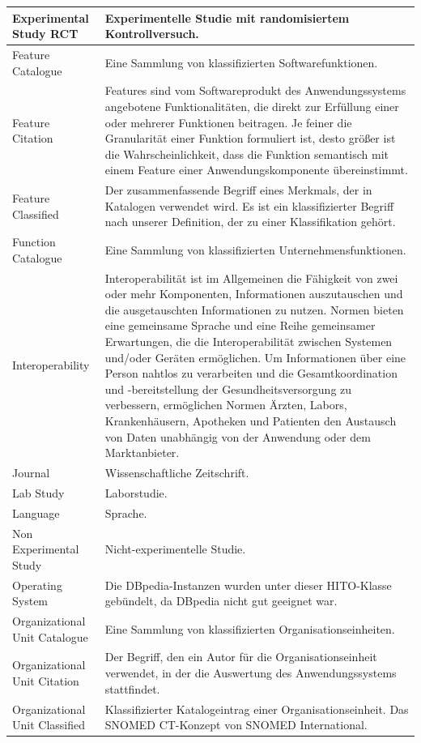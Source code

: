 \begin{longtable}{ | p{} | p{7 cm} | }
\hline
Experimental Study RCT &  Experimentelle Studie mit randomisiertem Kontrollversuch. \\
\hline
Feature Catalogue & Eine Sammlung von klassifizierten Softwarefunktionen. \\
\hline
Feature Citation & Features sind vom Softwareprodukt des Anwendungssystems angebotene Funktionalitäten, die direkt zur Erfüllung einer oder mehrerer Funktionen beitragen. Je feiner die Granularität einer Funktion formuliert ist, desto größer ist die Wahrscheinlichkeit, dass die Funktion semantisch mit einem Feature einer Anwendungskomponente übereinstimmt. \\
\hline
Feature Classified & Der zusammenfassende Begriff eines Merkmals, der in Katalogen verwendet wird. Es ist ein klassifizierter Begriff nach unserer Definition, der zu einer Klassifikation gehört.  \\
\hline
Function Catalogue & Eine Sammlung von klassifizierten Unternehmensfunktionen. \\
\hline
Interoperability & Interoperabilität ist im Allgemeinen die Fähigkeit von zwei oder mehr Komponenten, Informationen auszutauschen und die ausgetauschten Informationen zu nutzen. Normen bieten eine gemeinsame Sprache und eine Reihe gemeinsamer Erwartungen, die die Interoperabilität zwischen Systemen und/oder Geräten ermöglichen. Um Informationen über eine Person nahtlos zu verarbeiten und die Gesamtkoordination und -bereitstellung der Gesundheitsversorgung zu verbessern, ermöglichen Normen Ärzten, Labors, Krankenhäusern, Apotheken und Patienten den Austausch von Daten unabhängig von der Anwendung oder dem Marktanbieter. \\
\hline
Journal & Wissenschaftliche Zeitschrift. \\
\hline
Lab Study & Laborstudie. \\
\hline
Language & Sprache. \\
\hline
Non Experimental Study & Nicht-experimentelle Studie. \\
\hline
Operating System & Die DBpedia-Instanzen wurden unter dieser HITO-Klasse gebündelt, da DBpedia nicht gut geeignet war. \\
\hline
Organizational Unit Catalogue & Eine Sammlung von klassifizierten Organisationseinheiten. \\
\hline
Organizational Unit Citation & Der Begriff, den ein Autor für die Organisationseinheit verwendet, in der die Auswertung des Anwendungssystems stattfindet. \\
\hline
Organizational Unit Classified & Klassifizierter Katalogeintrag einer Organisationseinheit. Das SNOMED CT-Konzept von SNOMED International. \\

\end{longtable}
